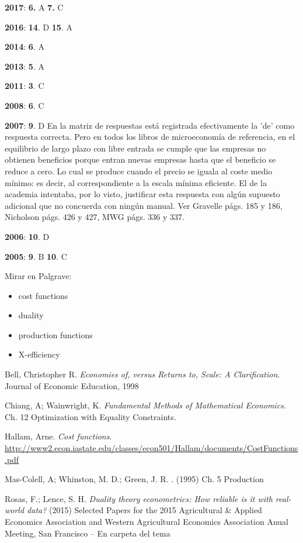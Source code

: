 \documentclass{nuevotema}
\begin{document}
\notas

\textbf{2017}: \textbf{6.} A \textbf{7.} C

\textbf{2016}: \textbf{14}. D \textbf{15}. A

\textbf{2014}: \textbf{6}. A

\textbf{2013}: \textbf{5}. A

\textbf{2011}: \textbf{3}. C

\textbf{2008}: \textbf{6}. C

\textbf{2007}: \textbf{9}. D En la matriz de respuestas está registrada efectivamente la 'de' como respuesta correcta. Pero en todos los libros de microeconomía de referencia, en el equilibrio de largo plazo con libre entrada se cumple que las empresas no obtienen beneficios porque entran nuevas empresas hasta que el beneficio se reduce a cero. Lo cual se produce cuando el precio se iguala al coste medio mínimo: es decir, al correspondiente a la escala mínima eficiente. El de la academia intentaba, por lo visto, justificar esta respuesta con algún supuesto adicional que no concuerda con ningún manual. Ver Gravelle págs. 185 y 186, Nicholson págs. 426 y 427, MWG págs. 336 y 337.

\textbf{2006}: \textbf{10}. D

\textbf{2005}: \textbf{9}. B \textbf{10}. C


\bibliografia

Mirar en Palgrave:
\begin{itemize}
	\item cost functions
	\item duality
	\item production functions
	\item X-efficiency
\end{itemize}


Bell, Christopher R. \textit{Economies of, versus Returns to, Scale: A Clarification}. Journal of Economic Education, 1998

Chiang, A; Wainwright, K. \textit{Fundamental Methods of Mathematical Economics.} Ch. 12 Optimization with Equality Constraints.

Hallam, Arne. \textit{Cost functions}. \url{http://www2.econ.iastate.edu/classes/econ501/Hallam/documents/CostFunctions.pdf}

Mas-Colell, A; Whinston, M. D.; Green, J. R. . (1995) Ch. 5 Production

Rosas, F.; Lence, S. H. \textit{Duality theory econometrics: How reliable is it with real-world data?} (2015) Selected Papers for the 2015 Agricultural \& Applied Economics Association and Western Agricultural Economics Association Anual Meeting, San Francisco -- En carpeta del tema
\end{document}
